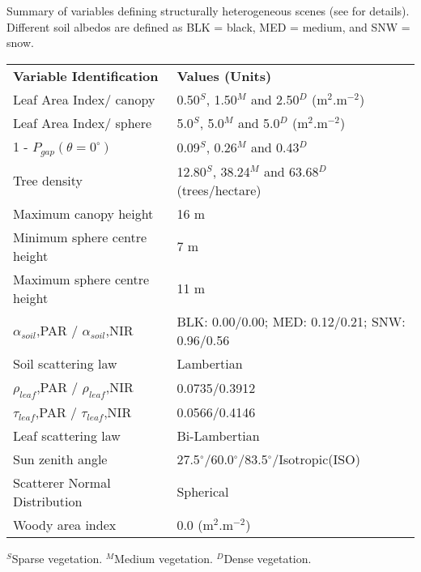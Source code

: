 \documentclass[a4paper,11pt]{report}
\begin{document}
\begin{threeparttable}
\centering
\caption{Summary of variables defining structurally heterogeneous scenes (see \citet{Widlowski2011} for details). Different soil albedos are defined as BLK = black, MED = medium, and SNW = snow.}
\begin{tabular}{l{} l{}}
     \hline
     \hline
\textbf{Variable Identification}   & \textbf{Values (Units)}\\
\noalign{\smallskip}\hline
Leaf Area Index/ canopy	                & 0.50$^S$, 1.50$^M$ and 2.50$^D$ (m$^2$.m$^{-2}$)\\
Leaf Area Index/ sphere	                & 5.0$^S$, 5.0$^M$ and 5.0$^D$  (m$^2$.m$^{-2}$)\\
1 - $P_{gap} (\theta = 0^{\circ})$      & 0.09$^S$, 0.26$^M$ and 0.43$^D$\\
Tree density                            & 12.80$^S$, 38.24$^M$ and 63.68$^D$ (trees/hectare)\\
Maximum canopy height                   & 16 m\\
Minimum sphere centre height	        & 7 m\\
Maximum sphere centre height	        & 11 m\\
$\alpha_{soil}$,PAR / $\alpha_{soil}$,NIR	& BLK: 0.00/0.00; MED: 0.12/0.21; SNW: 0.96/0.56\\
Soil scattering law	                & Lambertian\\
$\rho_{leaf}$,PAR / $\rho_{leaf}$,NIR   & 0.0735/0.3912\\
$\tau_{leaf}$,PAR / $\tau_{leaf}$,NIR   & 0.0566/0.4146\\
Leaf scattering law                     & Bi-Lambertian\\
Sun zenith angle	                & 27.5$^{\circ}$/60.0$^{\circ}$/83.5$^{\circ}$/Isotropic(ISO)\\
Scatterer Normal Distribution           & Spherical\\
Woody area index                        & 0.0 (m$^2$.m$^{-2}$)\\
\hline
\hline%
\end{tabular}
\begin{tablenotes}
      \small
      \item $^S$Sparse vegetation. $^M$Medium vegetation. $^D$Dense vegetation. 
\end{tablenotes}
\label{tab:RAMI4PILPS}
\end{threeparttable}
\bigskip
\end{document}
